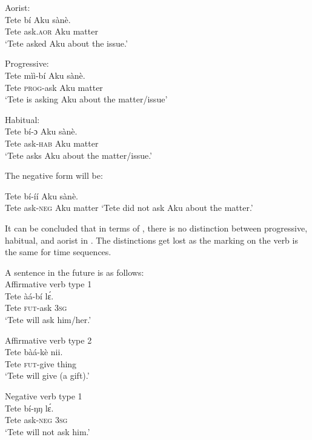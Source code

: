 \documentclass[output=paper,newtxmath,modfonts,nonflat,hidelinks]{langsci/langscibook}
\begin{document}
\ea \label{ex:ollennu:28} 
Aorist:\\
\gll Tete bí Aku sànè.\\
Tete ask.\textsc{aor} Aku matter\\
\glt `Tete asked Aku about the issue.'
\z

\ea \label{ex:ollennu:29}
Progressive: \\
\gll Tete mìì-bí Aku sànè.\\
Tete \textsc{prog}-ask Aku matter\\
\glt `Tete is asking Aku about the matter/issue'
\z

\ea \label{ex:ollennu:30}
Habitual: \\
\gll Tete bí-ɔ Aku sànè.\\
Tete ask-\textsc{hab} Aku matter\\
\glt`Tete asks Aku about the matter/issue.'
\z

The negative form will be:

\ea \label{ex:ollennu:31}
Tete bí-íí Aku sànè.\\
Tete ask-\textsc{neg} Aku matter
\glt `Tete did not ask Aku about the matter.'
\z

It can be concluded that in terms of , there is no distinction between progressive, habitual, and aorist in . The distinctions get lost as the  marking on the verb is the same for time sequences.

A sentence in the future is as follows:\\


\ea Affirmative verb type 1 \label{ex:ollennu:32}\\
\gll Tete àá-bí l\'ɛ.\\
Tete \textsc{fut}-ask 3\textsc{sg} \\
\glt `Tete will ask him/her.'
\z



\ea Affirmative verb type 2
\label{ex:ollennu:33}\\
\gll Tete bàá-kè nii.\\
Tete \textsc{fut}-give thing\\
\glt `Tete will give (a gift).'\\
\z



\ea Negative verb type 1 \\ \label{ex:ollennu:34}
\gll Tete bí-ŋŋ l\'ɛ.\\
Tete ask-\textsc{neg} 3\textsc{sg}\\
\glt `Tete will not ask him.'
\z
\end{document}

